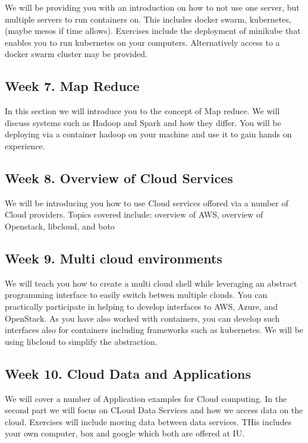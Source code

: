 We will be providing you with an introduction on how to not use one
server, but multiple servers to run containers on. This includes
docker swarm, kubernetes, (maybe mesos if time allows).
Exercises include the deployment of minikube that enables you to run
kubernetes on your computers. Alternatively access to a docker swarm
cluster may be provided.


\subsection{Week 7. Map Reduce}

In this section we will introduce you to the concept of Map reduce. We
will discuss systems such as Hadoop and Spark and how they differ. You
will be deploying via a container hadoop on your machine and use it to
gain hands on experience.

\subsection{Week 8. Overview of Cloud Services}

We will be introducing you how to use Cloud services offored via a
number of Cloud providers. Topics covered include: overview of AWS,
overview of Openstack, libcloud, and boto

\subsection{Week 9. Multi cloud environments}

We will teach you how to create a multi cloud shell while leveraging
an abstract programming interface to easily switch betwen multiple
clouds. You can practically participate in helping to develop
interfaces to AWS, Azure, and OpenStack. As you have also worked with
containers, you can develop such interfaces also for containers
including frameworks such as kubernetes. We will be using libcloud to
simplify the abstraction.
	
\subsection{Week 10. Cloud Data and Applications}

We will cover a number of Application examples for Cloud computing. In
the second part we will focus on CLoud Data Services and how we access
data on the cloud. Exercises will include moving data between data
services. THis includes your own computer, box and google which both
are offered at IU.


